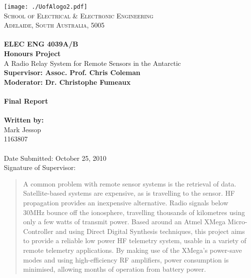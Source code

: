 \documentclass[a4paper,12pt]{article}
\begin{document}
\thispagestyle{empty}
\vspace*{\fill}
\texttt{[image: ./UofAlogo2.pdf]}\\
\noindent
\textsc{
\textsc{School of Electrical \& Electronic Engineering}\\
Adelaide, South Australia, 5005\\ \\
}
\noindent
\Large{\textbf{
ELEC ENG 4039A/B \\
Honours Project\\
	}}
	\Large{
		A Radio Relay System for Remote Sensors in the Antarctic \\
	}
	\small{\textbf{Supervisor: Assoc. Prof. Chris Coleman}}\\
	\small{\textbf{Moderator: Dr. Christophe Fumeaux}}
	\ \\
	\ \\
	\Large{\textbf{
		Final Report \\
	}}
	\ \\
	\small{\textbf{
		Written by: \\}
		Mark Jessop \\
		1163807
	}
	\ \\
	\ \\
	Date Submitted: October 25, 2010 \\
	Signature of Supervisor: \\
 \vspace*{\fill}

\newpage
 \thispagestyle{empty}
 \vspace*{\fill}
\begin{abstract}
\noindent
A common problem with remote sensor systems is the retrieval of data. Satellite-based systems are expensive, as is travelling to the sensor. HF propagation provides an inexpensive alternative. Radio signals below 30MHz bounce off the ionosphere, travelling thousands of kilometres using only a few watts of transmit power.
Based around an Atmel XMega Micro-Controller and using Direct Digital Synthesis techniques, this project aims to provide a reliable low power HF telemetry system, usable in a variety of remote telemetry applications. 
By making use of the XMega's power-save modes and using high-efficiency RF amplifiers, power consumption is minimised, allowing months of operation from battery power.
\end{abstract}
\vspace*{\fill}
\newpage
\setcounter{tocdepth}{2}
\tableofcontents
\newpage
\end{document}
